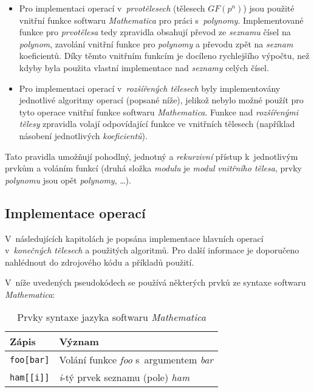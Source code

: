 \documentclass[thesis=M,czech,hidelinks]{FITthesis}[2012/06/26]
\newcommand{\0}{{\textcolor[gray]{0.80}{0}}}
\begin{document}
\begin{itemize}
    \item Pro implementaci operací v~\emph{prvotělesech} (tělesech $GF(p^n)$)
        jsou použité vnitřní funkce softwaru \emph{Mathematica} pro práci
        s~\emph{polynomy}. Implementované funkce pro \emph{prvotělesa} tedy
        zpravidla obsahují převod ze \emph{seznamu} čísel na \emph{polynom},
        zavolání vnitřní funkce pro \emph{polynomy} a převodu zpět na
        \emph{seznam} koeficientů. Díky těmto vnitřním funkcím je docíleno
        rychlejšího výpočtu, než kdyby byla použita vlastní implementace nad
        \emph{seznamy} celých čísel.

    \item Pro implementaci operací v~\emph{rozšířených tělesech} byly
        implementovány jednotlivé algoritmy operací (popsané níže), jelikož
        nebylo možné použít pro tyto operace vnitřní funkce softwaru
        \emph{Mathematica}. Funkce nad \emph{rozšířenými tělesy} zpravidla
        volají odpovídající funkce ve vnitřních tělesech (například násobení
        jednotlivých \emph{koeficientů}).

\end{itemize}

Tato pravidla umožňují pohodlný, jednotný a \emph{rekurzivní} přístup
k~jednotlivým prvkům a voláním funkcí (druhá složka \emph{modulu} je
\emph{modul} \emph{vnitřního tělesa}, prvky \emph{polynomu} jsou opět
\emph{polynomy}, \ldots).

\subsection{Implementace operací}
V~následujících kapitolách je popsána implementace hlavních operací
v~\emph{konečných tělesech} a použitých algoritmů. Pro další informace je
doporučeno nahlédnout do zdrojového kódu a příkladů použití.

V~níže uvedených pseudokódech se používá některých prvků ze syntaxe softwaru
\emph{Mathematica}:

\begin{table}[h!]
    \centering
    \begin{tabular}{l  l}
        Zápis               & Význam                                            \\
        \hline
        \texttt{foo[bar]}   & Volání funkce \emph{foo} s~argumentem \emph{bar}  \\
        \texttt{ham[[i]]}   & \emph{i}-tý prvek seznamu (pole) \emph{ham}       \\
    \end{tabular}
    \caption{Prvky syntaxe jazyka softwaru \emph{Mathematica}}
\end{table}
\end{document}

